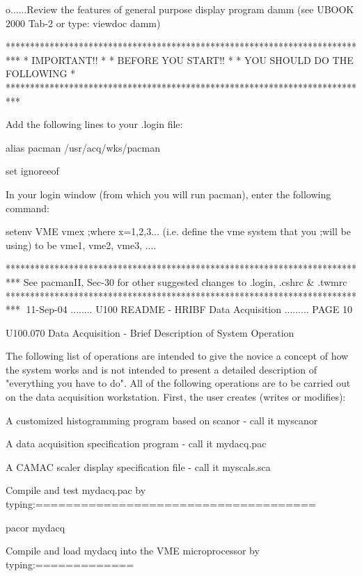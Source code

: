  
   o......Review the features of general purpose display program damm
          (see UBOOK 2000 Tab-2 or type: viewdoc damm)
 
 
   ***************************************************************************
   *                              IMPORTANT!!                                *
   *                           BEFORE YOU START!!                            *
   *                       YOU SHOULD DO THE FOLLOWING                       *
   ***************************************************************************
 
   Add the following lines to your .login file:
 
   alias pacman /usr/acq/wks/pacman
 
   set ignoreeof
 
   In  your login window (from which you will run pacman), enter the following
   command:
 
   setenv VME vmex  ;where x=1,2,3... (i.e. define the vme system that you
                    ;will be using) to be vme1, vme2, vme3, ....
 
   ***************************************************************************
   See pacmanII, Sec-30 for other suggested changes to .login, .cshrc & .twmrc
   ***************************************************************************
    
   11-Sep-04 ........ U100  README - HRIBF Data Acquisition ......... PAGE  10
 
 
   U100.070  Data Acquisition - Brief Description of System Operation
 
   The following list of operations are intended to give the novice a  concept
   of  how  the  system  works  and  is  not  intended  to  present a detailed
   description   of  "everything  you  have  to  do".  All  of  the  following
   operations are to be carried  out  on  the  data  acquisition  workstation.
   First, the user creates (writes or modifies):
 
   A customized histogramming program based on scanor - call it myscanor
 
   A data acquisition specification program  - call it mydacq.pac
 
   A CAMAC scaler display specification file - call it myscals.sca
 
   Compile and test mydacq.pac by typing:=====================================
 
        pacor mydacq
 
   Compile and load mydacq into the VME microprocessor by typing:=============
 
